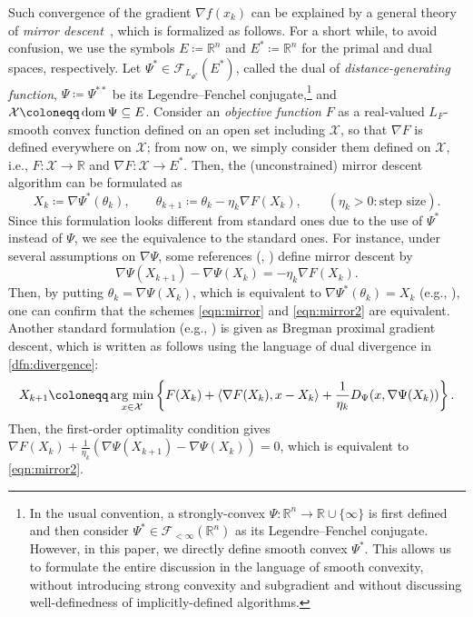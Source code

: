\documentclass[11pt,a4paper]{article}
\theoremstyle{definition}
\theoremstyle{plain}
\newcommand{\RR}{{\mathbb{R}}}
\newcommand{\argmin}{\mathop{\rm arg~min}\limits}
\newcommand{\dom}{\mathop{\rm dom}}
\begin{document}
Such convergence of the gradient $\nabla f(x_k)$ can be explained by a general theory of \textit{mirror descent}~\cite{NY1983}, which is formalized as follows.
For a short while, to avoid confusion, we use the symbols $E \coloneqq \RR^n$ and $E^\ast \coloneqq \RR^n$ for the primal and dual spaces, respectively.
Let $\Psi^\ast \in \mathcal{F}_{L_{\Psi^\ast}}(E^\ast)$, called the dual of \textit{distance-generating function}, $\Psi \coloneqq \Psi^{\ast\ast}$ be its Legendre--Fenchel conjugate,\footnote{In the usual convention, a strongly-convex $\Psi: \RR^n \to \RR\cup\{\infty\}$ is first defined and then consider $\Psi^\ast \in \mathcal{F}_{<\infty}(\RR^n)$ as its Legendre--Fenchel conjugate. However, in this paper, we directly define smooth convex $\Psi^\ast$. This allows us to formulate the entire discussion in the language of smooth convexity, without introducing strong convexity and subgradient and without discussing well-definedness of implicitly-defined algorithms.} and $\mathcal{X} \coloneqq \dom\Psi \subseteq E$.
Consider an \textit{objective function} $F$ as a real-valued $L_F$-smooth convex function defined on an open set including $\mathcal{X}$, so that $\nabla F$ is defined everywhere on $\mathcal{X}$; from now on, we simply consider them defined on $\mathcal{X}$, i.e., $F: \mathcal{X} \to \RR$ and $\nabla F: \mathcal{X} \to E^\ast$.
Then, the (unconstrained) mirror descent algorithm can be formulated as
\begin{equation}
    \label{eqn:mirror}
    X_k \coloneqq \nabla \Psi^\ast\left(\theta_k\right),  \qquad \theta_{k + 1} \coloneqq \theta_k - \eta_k\nabla F\left(X_k\right), \qquad (\eta_k > 0: \text{step size}).
\end{equation}
Since this formulation looks different from standard ones due to the use of $\Psi^\ast$ instead of $\Psi$, we see the equivalence to the standard ones.
For instance, under several assumptions on $\nabla \Psi$, some references (\cite[Section~4.2]{Bubeck2015}, \cite[Section~2.1.3]{WilsonPhD}) define mirror descent by
\begin{equation}
    \label{eqn:mirror2}
    \nabla\Psi(X_{k + 1}) - \nabla\Psi(X_k) = -\eta_k\nabla F(X_k).
\end{equation}
Then, by putting $\theta_k = \nabla \Psi(X_k)$, which is equivalent to $\nabla\Psi^\ast(\theta_k) = X_k$ (e.g., \cite[Corollary~E.1.4.4]{HL2001}), one can confirm that the schemes \eqref{eqn:mirror} and \eqref{eqn:mirror2} are equivalent.
Another standard formulation (e.g., \cite[Section~9]{Beck2017}) is given as Bregman proximal gradient descent, which is written as follows using the language of dual divergence in \cref{dfn:divergence}:
\[
    X_{k + 1} \coloneqq \argmin_{x \in \mathcal{X}}\left\{F(X_k) + \langle \nabla F(X_k), x - X_k\rangle +\frac1{\eta_k}D_{\Psi}(x, \nabla\Psi(X_k))\right\}.
\]
Then, the first-order optimality condition gives $\nabla F(X_k) + \frac1{\eta_k}(\nabla\Psi(X_{k + 1}) - \nabla\Psi(X_k)) = 0$, which is equivalent to \eqref{eqn:mirror2}.
\end{document}
